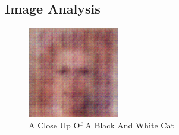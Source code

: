 \documentclass{article}%
\begin{document}
%
\subsection{Image Analysis}%
\label{subsec:ImageAnalysis}%


\begin{figure}[h!]%
\centering%
\includegraphics[width=150px]{500_fake_images/samples_5_84.png}%
\caption{A Close Up Of A Black And White Cat}%
\end{figure}

%
\end{document}
